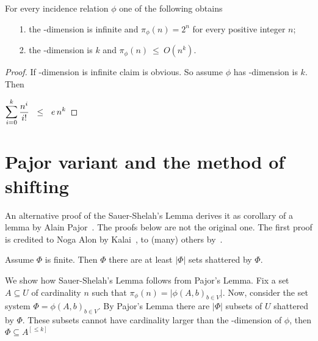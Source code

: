 \documentclass[sputnik.tex]{subfiles}
\begin{document}
\begin{corollary}\label{coroll_Sauer}
For every incidence relation $\phi$ one of the following obtains
\begin{itemize}
 \item[1.] the \vc-dimension is infinite and $\pi_\phi(n)=2^n$ for every positive integer $n$;
 \item[2.] the \vc-dimension is $k$ and $\pi_\phi(n)\ \le\ O(n^k)$.
\end{itemize}
\end{corollary}
\begin{proof}
If \vc-dimension is infinite claim  is obvious.
So assume $\phi$ has \vc-dimension is $k$.
Then

\medrel{\le}$\displaystyle\bigsum^k_{i=0}\frac{n^i}{i!}\medrel{\le}e\,n^k$%
\end{proof}

% 

\section{Pajor variant and the method of shifting}

An alternative proof of the Sauer-Shelah's Lemma derives it as corollary of a lemma by Alain Pajor~\cite{pajor}.
The proofs below are not the original one.
The first proof is credited to Noga Alon by Kalai~\cite{kalai}, to (many) others by~\cite{ARS}.

\begin{proposition}\label{prop_Pajor}
Assume $\Phi$ is finite.
Then $\Phi$ there are at least $|\Phi|$ sets shattered by $\Phi$.
\end{proposition}

We show how Sauer-Shelah's Lemma follows from Pajor's Lemma.
Fix a set $A\subseteq U$ of cardinality $n$ such that $\pi_\phi(n)=\big|\phi(A,b)_{b\in V}\big|$.
Now, consider the set system $\Phi=\phi(A,b)_{b\in V}$.
By Pajor's Lemma there are $|\Phi|$ subsets of $U$ shattered by $\Phi$.
These subsets cannot have cardinality larger than the \vc-dimension of $\phi$, then $\Phi\subseteq A^{[\le k]}$
\end{document}
